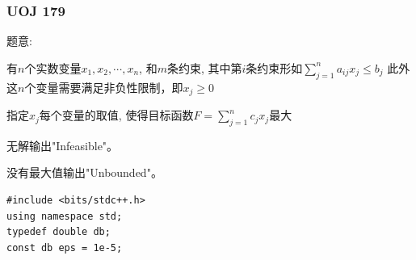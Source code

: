 \subsubsection{UOJ 179}

题意:\par
有$n$个实数变量$x_1, x_2, \cdots, x_n$, 和$m$条约束, 其中第$i$条约束形如$\sum\limits_{j = 1}^n a_{ij}x_j \leq b_j$
此外这$n$个变量需要满足非负性限制，即$x_j \geq 0$\par
指定$x_j$每个变量的取值, 使得目标函数$F = \sum\limits_{j = 1}^n c_jx_j$最大\par

无解输出"Infeasible"。\par
没有最大值输出"Unbounded"。\par

\begin{lstlisting}
#include <bits/stdc++.h>
using namespace std;
typedef double db;
const db eps = 1e-5;


\end{lstlisting}
